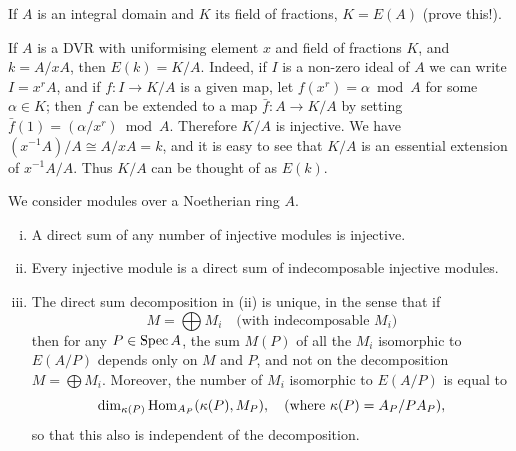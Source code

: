 \begin{example}\label{ex:18.1}
If $A$ is an integral domain and $K$ its field of fractions, $K = E(A)$
(prove this!).
\end{example}

\begin{example}\label{ex:18.2}
If $A$ is a DVR with uniformising element $x$ and field of fractions
$K$, and $k = A/xA$, then $E(k) = K/A$. Indeed, if $I$ is a non-zero ideal of $A$
we can write $I = x^rA$, and if $f\colon I \to K/A$ is a given map, let $f(x^r) = \alpha
\bmod A$ for some $\alpha \in K$; then $f$ can be extended to a map $\bar{f}\colon A \to K/A$
by setting $\bar{f}(1) = (\alpha/x^r) \bmod A$. Therefore $K/A$ is injective. We have
$(x^{-1}A)/A \cong A/xA = k$, and it is easy to see that $K/A$ is an essential extension
of $x^{-1}A/A$. Thus $K/A$ can be thought of as $E(k)$.
\end{example}

\begin{theorem}\label{thm:18.5}
We consider modules over a Noetherian ring $A$.
\begin{enumerate}[(i)]
  \item A direct sum of any number of injective modules is injective.
  \item Every injective module is a direct sum of indecomposable injective
        modules.
  \item The direct sum decomposition in (ii) is unique, in the sense that if
        \[
          M = \bigoplus M_i \quad \text{(with indecomposable } M_i\text{)}
        \]
        then for any $P \in \operatorname{Spec} A$, the sum $M(P)$ of all the $M_i$ isomorphic to $E(A/P)$
        depends only on $M$ and $P$, and not on the decomposition $M = \bigoplus M_i$.
        Moreover, the number of $M_i$ isomorphic to $E(A/P)$ is equal to
        \[
          \dim_{\kappa(P)} \operatorname{Hom}_{A_P}(\kappa(P), M_P), \quad \text{(where } \kappa(P) = A_P/PA_P),
        \]
        so that this also is independent of the decomposition.
\end{enumerate}
\end{theorem}

